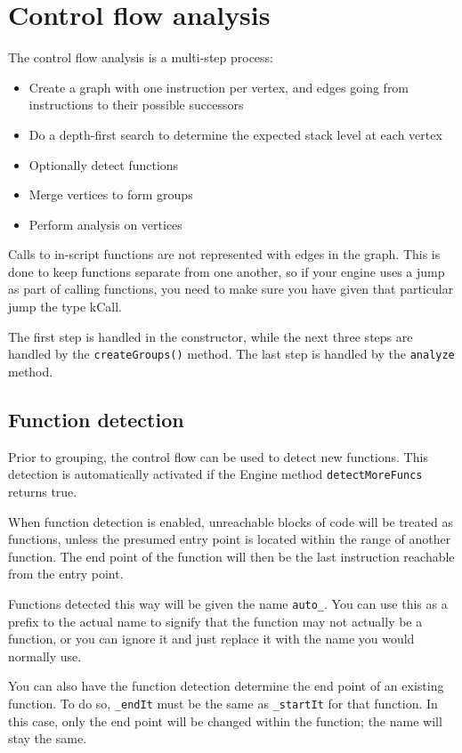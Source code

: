\section{Control flow analysis}

The control flow analysis is a multi-step process:

\begin{itemize}
\item Create a graph with one instruction per vertex, and edges going from instructions to their possible successors
\item Do a depth-first search to determine the expected stack level at each vertex
\item Optionally detect functions
\item Merge vertices to form groups
\item Perform analysis on vertices
\end{itemize}

Calls to in-script functions are not represented with edges in the graph. This is done to keep functions separate from one another, so if your engine uses a jump as part of calling functions, you need to make sure you have given that particular jump the type kCall.

The first step is handled in the constructor, while the next three steps are handled by the \verb+createGroups()+ method. The last step is handled by the \verb+analyze+ method.

\subsection{Function detection}
\label{sec:autofunc}
Prior to grouping, the control flow can be used to detect new functions. This detection is automatically activated if the Engine method \verb+detectMoreFuncs+ returns true.

When function detection is enabled, unreachable blocks of code will be treated as functions, unless the presumed entry point is located within the range of another function. The end point of the function will then be the last instruction reachable from the entry point.

Functions detected this way will be given the name \verb+auto_+. You can use this as a prefix to the actual name to signify that the function may not actually be a function, or you can ignore it and just replace it with the name you would normally use.

You can also have the function detection determine the end point of an existing function. To do so, \verb+_endIt+ must be the same as \verb+_startIt+ for that function. In this case, only the end point will be changed within the function; the name will stay the same.

